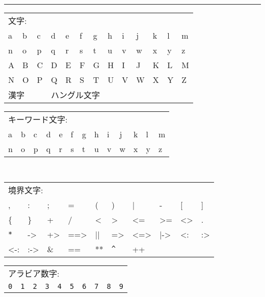 \documentclass[\pformat,12pt]{jarticle}
\begin{document}
\begin{table}[ht]
\setlength{\tabcolsep}{3.5mm}
\setlength{\arraycolsep}{3.5mm}

\rule{\textwidth}{.5mm}
    {\sf
    \begin{tabular}{*{13}{l}} 
        \multicolumn{13}{l}{\rm 文字:} \\
        a & b & c & d & e & f & g & h & i & j & k & l & m \\
        n & o & p & q & r & s & t & u & v & w & x & y & z \\
        A & B & C & D & E & F & G & H & I & J & K & L & M \\
        N & O & P & Q & R & S & T & U & V & W & X & Y & Z \\
        \multicolumn{3}{l}{漢字} & \multicolumn{10}{l}{ハングル文字}
    \end{tabular}
    }

\blankline
    {\sf  
    \begin{tabular}{*{13}{l}}
        \multicolumn{13}{l}{\rm キーワード文字:} \\
        a & b & c & d & e & f & g & h & i & j & k & l & m \\
        n & o & p & q & r & s & t & u & v & w & x & y & z
    \end{tabular}
    }

\blankline
{\tt
    \begin{tabular}{*{10}{l}}
        \multicolumn{10}{l}{\mbox{{\rm 境界文字:}}} \\
          ,         & :         & ;         & =         & (         &
          )         & |         & -         & [         & ]         \\
          \{        & \}        & +         & /         & <         &
          >         & <=        & >=        & <>        &  .        \\
          \verb+*+  & ->        & +>        & ==>       & ||        &
          =>        &   <=>     & |->       & <:        & :>        \\
          <-:       & :->       & \&        & ==        & **        & 
          \verb+^+  & ++        &           &           &           \\
    \end{tabular}
}

\blankline
    \begin{tabular}{*{10}{l}}
        \multicolumn{10}{l}{アラビア数字:} \\
        {\tt 0}
        & {\tt 1} 
        & {\tt 2} 
        & {\tt 3} 
        & {\tt 4} 
        & {\tt 5}
        & {\tt 6} 
        & {\tt 7} 
        & {\tt 8} 
        & {\tt 9} 
     \end{tabular}


\end{table}
\end{document}
